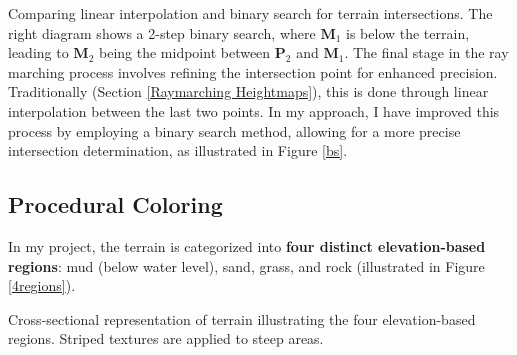\vspace{\baselineskip}

{Comparing linear interpolation and binary search for terrain intersections. The right diagram shows a 2-step binary search, where $\mathbf{M}_1$ is below the terrain, leading to $\mathbf{M}_2$ being the midpoint between $\mathbf{P}_2$ and $\mathbf{M}_1$.}{
The final stage in the ray marching process involves refining the intersection point for enhanced precision. Traditionally (Section \ref{Raymarching Heightmaps}), this is done through linear interpolation between the last two points. In my approach, I have improved this process by employing a binary search method, allowing for a more precise intersection determination, as illustrated in Figure \ref{bs}.
}








\subsection{Procedural Coloring}
\label{Terrain Procedural Texturing}

In my project, the terrain is categorized into \textbf{four distinct elevation-based regions}: mud (below water level), sand, grass, and rock (illustrated in Figure \ref{4regions}).

{Cross-sectional representation of terrain illustrating the four elevation-based regions. Striped textures are applied to steep areas.}

